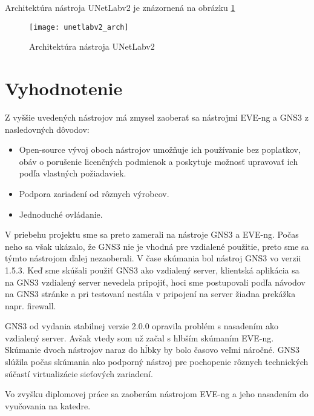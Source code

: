 Architektúra nástroja UNetLabv2 je znázornená na obrázku \ref{obr:unetlabv2_arch}

\begin{figure}
    \centering
    \texttt{[image: unetlabv2\_arch]}
    \caption{Architektúra nástroja UNetLabv2} \cite{obr_unetlabv2_arch}
    \label{obr:unetlabv2_arch}
\end{figure}

\section{Vyhodnotenie}

Z vyššie uvedených nástrojov má zmysel zaoberať sa nástrojmi EVE-ng a GNS3 z nasledovných dôvodov:
\begin{itemize}
    \item Open-source vývoj oboch nástrojov umožňuje ich používanie bez poplatkov, obáv o porušenie licenčných podmienok a poskytuje možnosť upravovať ich podľa vlastných požiadaviek.
    \item Podpora zariadení od rôznych výrobcov.
    \item Jednoduché ovládanie.
\end{itemize}

V priebehu projektu sme sa preto zamerali na nástroje GNS3 a EVE-ng. Počas neho sa však ukázalo, že GNS3 nie je vhodná pre vzdialené použitie, preto sme sa týmto nástrojom ďalej nezaoberali. V čase skúmania bol nástroj GNS3 vo verzii 1.5.3. Keď sme skúšali použiť GNS3 ako vzdialený server, klientská aplikácia sa na GNS3 vzdialený server nevedela pripojiť, hoci sme postupovali podľa návodov na GNS3 stránke a pri testovaní nestála v pripojení na server žiadna prekážka napr. firewall.

GNS3 od vydania stabilnej verzie 2.0.0 opravila problém s nasadením ako vzdialený server. Avšak vtedy som už začal s hlbším skúmaním EVE-ng. Skúmanie dvoch nástrojov naraz do hĺbky by bolo časovo veľmi náročné. GNS3 slúžila počas skúmania ako podporný nástroj pre pochopenie rôznych technických súčastí virtualizácie sieťových zariadení.

Vo zvyšku diplomovej práce sa zaoberám nástrojom EVE-ng a jeho nasadením do vyučovania na katedre.
